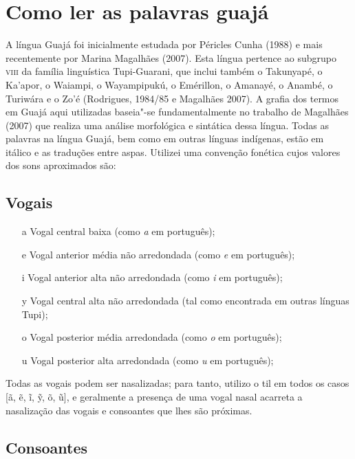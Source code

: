 
\chapter{Como ler as palavras guajá}


A língua Guajá foi inicialmente estudada por Péricles Cunha (1988) e
mais recentemente por Marina Magalhães (2007). Esta língua pertence ao
subgrupo \textsc{viii} da família linguística Tupi-Guarani, que inclui também o
Takunyapé, o Ka'apor, o Waiampi, o Wayampipukú, o Emérillon, o Amanayé,
o Anambé, o Turiwára e o Zo'é (Rodrigues, 1984/85 e Magalhães 2007). A
grafia dos termos em Guajá aqui utilizadas baseia"-se fundamentalmente no
trabalho de Magalhães (2007) que realiza uma análise morfológica e
sintática dessa língua. Todas as palavras na língua Guajá, bem como em
outras línguas indígenas, estão em itálico e as traduções entre aspas.
Utilizei uma convenção fonética cujos valores dos sons aproximados são:

\section{Vogais}

\begin{itemize}
\item[a] Vogal central baixa (como \emph{a} em português);

\item[e] Vogal anterior média não arredondada (como \emph{e} em português);

\item[i] Vogal anterior alta não arredondada (como \emph{i} em português);

\item[y] Vogal central alta não arredondada (tal como encontrada em outras línguas Tupi);

\item[o] Vogal posterior média arredondada (como \emph{o} em português);

\item[u] Vogal posterior alta arredondada (como \emph{u} em português);
\end{itemize} 


Todas as vogais podem ser nasalizadas; para tanto, utilizo o til em
todos os casos {[}ã, ẽ, ĩ, ỹ, õ, ũ{]}, e geralmente a presença de uma
vogal nasal acarreta a nasalização das vogais e consoantes que lhes são
próximas.

\section{Consoantes}

